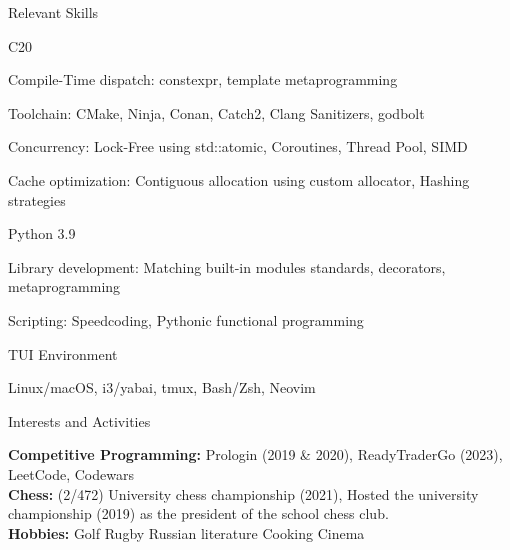 \documentclass[
	a4paper, %
	10pt, %
]{resume} %
\def\CC{{C\nolinebreak[4]\hspace{-.05em}\raisebox{.4ex}{\tiny\bf ++}}}
\begin{document}
\begin{rSection}{Relevant Skills}
	\begin{rSubsection}{\CC20}{}{}{}
    \item Compile-Time dispatch: constexpr, template metaprogramming
    \item Toolchain: CMake, Ninja, Conan, Catch2, Clang Sanitizers, godbolt
    \item Concurrency: Lock-Free using std::atomic, Coroutines, Thread Pool, SIMD
    \item Cache optimization: Contiguous allocation using custom allocator,  Hashing strategies
	\end{rSubsection}
  \begin{rSubsection}{Python 3.9}{}{}{}
    \item Library development: Matching built-in modules standards, decorators, metaprogramming
    \item Scripting: Speedcoding, Pythonic functional programming
  \end{rSubsection}
  \begin{rSubsection}{TUI Environment}{}{}{}
    \item Linux/macOS, i3/yabai, tmux, Bash/Zsh, Neovim
  \end{rSubsection}
\end{rSection}


\begin{rSection}{Interests and Activities}

	\textbf{Competitive Programming:} Prologin (2019 \& 2020), ReadyTraderGo (2023), LeetCode, Codewars \\
	\textbf{Chess:} (2/472) University chess championship (2021), Hosted the university championship (2019) as the president of the school chess club.\\
  \textbf{Hobbies:} Golf  Rugby  Russian literature  Cooking  Cinema
\end{rSection}
\end{document}
